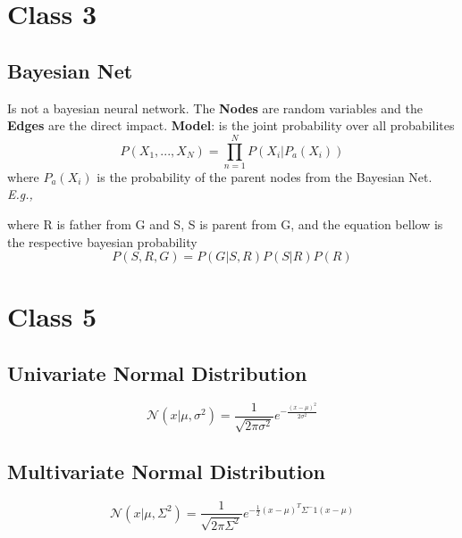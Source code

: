 \documentclass{article}
\newcommand{\Eg}{\textit{E.g.,}}
\begin{document}
\section{Class 3}
\subsection{Bayesian Net}
Is not a bayesian neural network. The \textbf{Nodes} are random variables and the \textbf{Edges} are the direct impact.
\textbf{Model}: is the joint probability over all probabilites
\begin{equation}
    P(X_1, ..., X_N) = \prod_{n=1}^{N} P(X_i|P_a(X_i))    
\end{equation}
where $P_a(X_i)$ is the probability of the parent nodes from the Bayesian Net.
\Eg
{} 
where R is father from G and S, S is parent from G, and the equation bellow is the respective bayesian probability
\begin{equation}
    P(S, R, G) = P(G|S, R)P(S|R)P(R)    
\end{equation}

\section{Class 5}
\subsection{Univariate Normal Distribution}
\begin{equation}
	\mathcal{N}(x|\mu, \sigma^2) = \frac{1}{\sqrt{2\pi\sigma^2}} e^{-\frac{(x - \mu)^2}{2\sigma^2}}    
\end{equation}
	
\subsection{Multivariate Normal Distribution}
\begin{equation}
    \mathcal{N}(x|\mu, \Sigma^2) = \frac{1}{\sqrt{2\pi\Sigma^2}} e^{-\frac{1}{2}(x - \mu)^T\Sigma^-1(x - \mu)}    
\end{equation}
		
\end{document}
